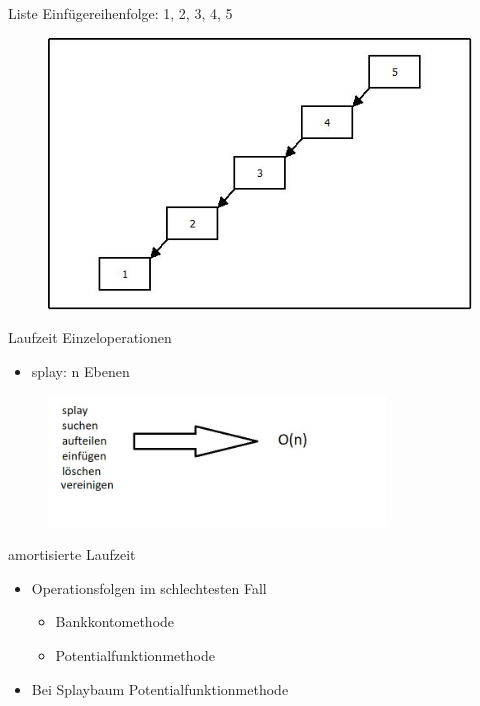 \documentclass[11pt]{beamer}
\begin{document}
	\begin{frame}{Liste}
		Einfügereihenfolge: 1, 2, 3, 4, 5
		\begin{figure}[h]
			\centering
			\includegraphics[height=0.45\textwidth]{"bilder/suchbaumhoeen"}	
		\end{figure}
		
	\end{frame}	
	
	\begin{frame}{Laufzeit Einzeloperationen}
		\begin{itemize}
			\item 	splay: n Ebenen
		\end{itemize} 
		\pause 
	
		\begin{figure}[h]
		\centering
		\includegraphics[width=0.8\textwidth]{"bilder/einzelop"}	
		\end{figure}
	\end{frame}	
	
	
	\begin{frame} {amortisierte Laufzeit}
		\begin{itemize}
			\item Operationsfolgen im schlechtesten Fall
			\begin{itemize}
				\item Bankkontomethode
				\item Potentialfunktionmethode
			\end{itemize}
			\pause
			\item Bei Splaybaum Potentialfunktionmethode
		\end{itemize}  	
	\end{frame}	
	
\end{document}

